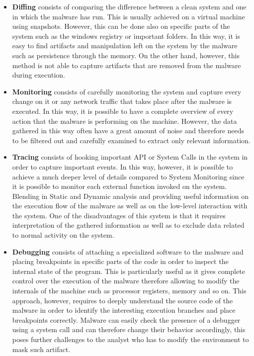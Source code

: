 \begin{itemize}
    \item \textbf{Diffing} consists of comparing the difference between a clean system and one in which the malware has run. This is usually achieved on a virtual machine using snapshots. However, this can be done also on specific parts of the system such as the windows registry or important folders. In this way, it is easy to find artifacts and manipulation left on the system by the malware such as persistence through the memory. On the other hand, however, this method is not able to capture artifacts that are removed from the malware during execution.  
    
    \item \textbf{Monitoring} consists of carefully monitoring the system and capture every change on it or any network traffic that takes place after the malware is executed. In this way, it is possible to have a complete overview of every action that the malware is performing on the machine. However, the data gathered in this way often have a great amount of noise and therefore needs to be filtered out and carefully examined to extract only relevant information.
    
    \item \textbf{Tracing} consists of hooking important API or System Calls in the system in order to capture important events. In this way, however, it is possible to achieve a much deeper level of details compared to System Monitoring since it is possible to monitor each external function invoked on the system. Blending in Static and Dynamic analysis and providing useful information on the execution flow of the malware as well as on the low-level interaction with the system. One of the disadvantages of this system is that it requires interpretation of the gathered information as well as to exclude data related to normal activity on the system.
    
    \item \textbf{Debugging} consists of attaching a specialized software to the malware and placing breakpoints in specific parts of the code in order to inspect the internal state of the program. This is particularly useful as it gives complete control over the execution of the malware therefore allowing to modify the internals of the machine such as processor registers, memory and so on. This approach, however, requires to deeply understand the source code of the malware in order to identify the interesting execution branches and place breakpoints correctly. Malware can easily check the presence of a debugger using a system call and can therefore change their behavior accordingly, this poses further challenges to the analyst who has to modify the environment to mask such artifact. 
    
\end{itemize}

